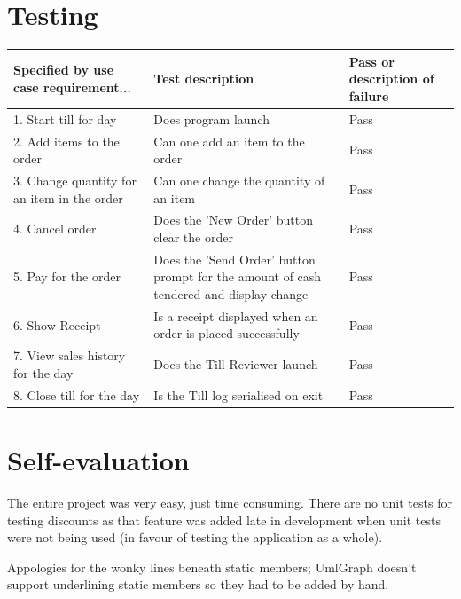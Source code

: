 \documentclass[11pt]{article} %
\begin{document}
\section{Testing}
\begin{tabular}{p{3cm}|p{6cm}|p{3cm}}
Specified by use case requirement... & Test description & Pass or description of failure \\
\hline
1. Start till for day & Does program launch & Pass \\
2. Add items to the order & Can one add an item to the order & Pass \\
3. Change quantity for an item in the order & Can one change the quantity of an item & Pass \\
4. Cancel order & Does the 'New Order' button clear the order & Pass \\
5. Pay for the order & Does the 'Send Order' button prompt for the amount of cash tendered and display change &  Pass \\
6. Show Receipt & Is a receipt displayed when an order is placed successfully & Pass \\
7. View sales history for the day & Does the Till Reviewer launch & Pass \\
8. Close till for the day & Is the Till log serialised on exit & Pass \\
\end{tabular}

\section{Self-evaluation}
The entire project was very easy, just time consuming. There are no unit tests for testing discounts as that feature was added late in development when unit tests were not being used (in favour of testing the application as a whole).

Appologies for the wonky lines beneath static members; UmlGraph doesn't support underlining static members so they had to be added by hand.
\end{document}
